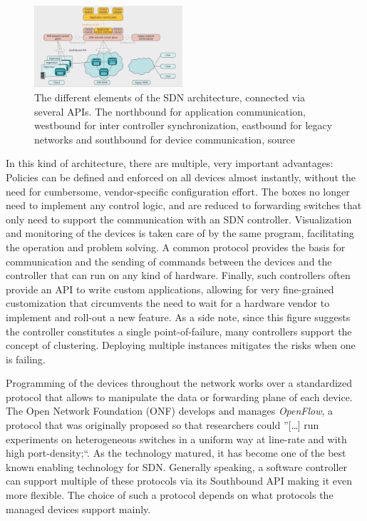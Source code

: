 \begin{figure}[h]
	\centering
	\includegraphics[width=0.49\textwidth]{images/sdnAPIs.png}
	\caption{The different elements of the SDN architecture, connected via several APIs. The northbound for application communication, westbound for inter controller synchronization, eastbound for legacy networks and southbound for device communication, source \cite{jarschel2014interfaces}}
	\label{img:sdnAPIs}
\end{figure}

In this kind of architecture, there are multiple, very important advantages: Policies can be defined and enforced on all devices almost instantly, without the need for cumbersome, vendor-specific configuration effort. The boxes no longer need to implement any control logic, and are reduced to forwarding switches that only need to support the communication with an SDN controller. Visualization and monitoring of the devices is taken care of by the same program, facilitating the operation and problem solving. A common protocol provides the basis for communication and the sending of commands between the devices and the controller that can run on any kind of hardware. Finally, such controllers often provide an API to write custom applications, allowing for very fine-grained customization that circumvents the need to wait for a hardware vendor to implement and roll-out a new feature. As a side note, since this figure suggests the controller constitutes a single point-of-failure, many controllers support the concept of clustering. Deploying multiple instances mitigates the risks when one is failing. 

Programming of the devices throughout the network works over a standardized protocol that allows to manipulate the data or forwarding plane of each device. The Open Network Foundation (ONF) develops and manages \textit{OpenFlow}, a protocol that was originally proposed so that researchers could ''[\dots] run experiments on heterogeneous switches in a uniform way at line-rate and with high port-density;``\cite{mckeown2008openflow}. As the technology matured, it has become one of the best known enabling technology for SDN. Generally speaking, a software controller can support multiple of these protocols via its Southbound API making it even more flexible. The choice of such a protocol depends on what protocols the managed devices support mainly. 

